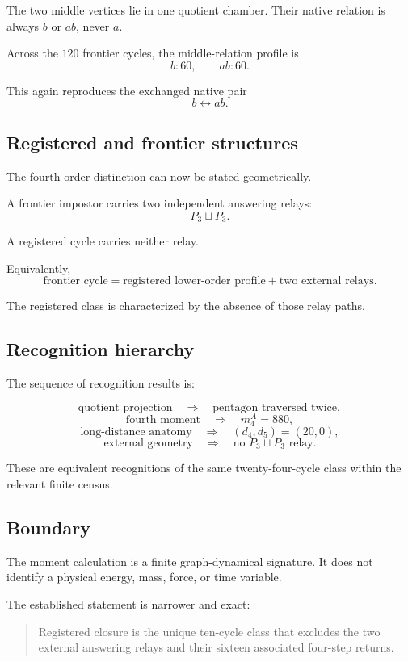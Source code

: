 The two middle vertices lie in one quotient chamber. Their native
relation is always \(b\) or \(ab\), never \(a\).

Across the \(120\) frontier cycles, the middle-relation profile is
\[
b:60,
\qquad
ab:60.
\]

This again reproduces the exchanged native pair
\[
b\longleftrightarrow ab.
\]

\subsection{Registered and frontier structures}

The fourth-order distinction can now be stated geometrically.

A frontier impostor carries two independent answering relays:
\[
P_3\sqcup P_3.
\]

A registered cycle carries neither relay.

Equivalently,
\[
\text{frontier cycle}
=
\text{registered lower-order profile}
+
\text{two external relays}.
\]

The registered class is characterized by the absence of those relay
paths.

\subsection{Recognition hierarchy}

The sequence of recognition results is:

\[
\text{quotient projection}
\quad\Longrightarrow\quad
\text{pentagon traversed twice},
\]
\[
\text{fourth moment}
\quad\Longrightarrow\quad
m_4^A=880,
\]
\[
\text{long-distance anatomy}
\quad\Longrightarrow\quad
(d_4,d_5)=(20,0),
\]
\[
\text{external geometry}
\quad\Longrightarrow\quad
\text{no }P_3\sqcup P_3\text{ relay}.
\]

These are equivalent recognitions of the same twenty-four-cycle class
within the relevant finite census.

\subsection{Boundary}

The moment calculation is a finite graph-dynamical signature. It does
not identify a physical energy, mass, force, or time variable.

The established statement is narrower and exact:

\begin{quote}
Registered closure is the unique ten-cycle class that excludes the
two external answering relays and their sixteen associated four-step
returns.
\end{quote}
